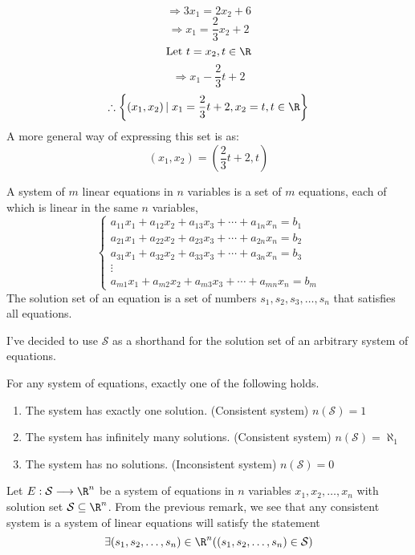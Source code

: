 \begin{answer}
	$$\Rightarrow3x_1=2x_2+6$$
	$$\Rightarrow x_1=\frac{2}{3}x_2+2$$
	$$\text{Let }t=x_2,t\in\R$$
	$$\Rightarrow x_1-\frac{2}{3}t+2$$
	$$\therefore\left\{(x_1,x_2)\left|\right. x_1=\frac{2}{3}t+2,x_2=t,t\in\R\right\}$$
	A more general way of expressing this set is as:
	$$(x_1,x_2)=\left(\frac{2}{3}t+2,t\right)$$
\end{answer}
\begin{definition}
	A system of $m$ linear equations in $n$ variables is a set of $m$ equations, each of which is linear in the same $n$ variables,
	$$\left\{
	\begin{array}{c}
		a_{11}x_1+a_{12}x_2+a_{13}x_3+\cdots+a_{1n}x_n=b_1\\
		a_{21}x_1+a_{22}x_2+a_{23}x_3+\cdots+a_{2n}x_n=b_2\\
		a_{31}x_1+a_{32}x_2+a_{33}x_3+\cdots+a_{3n}x_n=b_3\\
		\vdots\\
		a_{m1}x_1+a_{m2}x_2+a_{m3}x_3+\cdots+a_{mn}x_n=b_m
	\end{array}
	\right.$$
	The solution set of an equation is a set of numbers $s_1,s_2,s_3,\ldots,s_n$ that satisfies all equations.
\end{definition}
\begin{notation}
	I've decided to use $\mathcal{S}$ as a shorthand for the solution set of an arbitrary system of equations.
\end{notation}
\begin{remark}\label{rem:1}
	For any system of equations, exactly one of the following holds.
	\begin{enumerate}
		\item The system has exactly one solution. (Consistent system) $n(\mathcal{S})=1$
		\item The system has infinitely many solutions. (Consistent system) $n(\mathcal{S})=\aleph_1$
		\item The system has no solutions. (Inconsistent system) $n(\mathcal{S})=0$
	\end{enumerate}
\end{remark}
	Let $E:\mathcal{S}\longrightarrow\R^n$ be a system of equations in $n$ variables $x_1,x_2,\ldots,x_n$ with solution set $\mathcal{S}\subseteq\R^n$. From the previous remark, we see that any consistent system is a system of linear equations will satisfy the statement
	$$\exists(s_1,s_2,\ldots,s_n)\in\R^n((s_1,s_2,\ldots,s_n)\in\mathcal{S})$$
